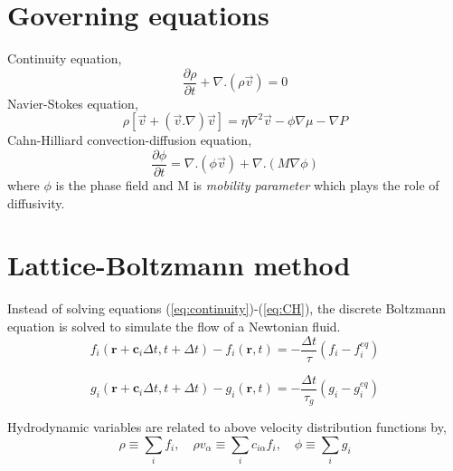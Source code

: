 \documentclass[a0,portrait]{a0poster}
\begin{document}
\begin{multicols}{3} %

\section{Governing equations}
Continuity equation,
\begin{equation}
\frac{\partial \rho}{\partial t} + \nabla.(\rho \vec{v}) = 0
\label{eq:continuity}
\end{equation}
Navier-Stokes equation,
\begin{equation}
\rho [\vec{v} + (\vec{v}.\nabla)\vec{v}] = \eta \nabla^2\vec{v}-\phi\nabla\mu - \nabla P
\label{eq:NS}
\end{equation}
Cahn-Hilliard convection-diffusion equation,
\begin{equation}
\frac{\partial \phi}{\partial t} = \nabla.(\phi \vec{v}) + \nabla.(M\nabla\phi)
\label{eq:CH}
\end{equation}
where $\phi$ is the phase field and M is \textit{mobility parameter} which plays the role of diffusivity.







\section{Lattice-Boltzmann method}
Instead of solving equations (\ref{eq:continuity})-(\ref{eq:CH}), the discrete Boltzmann equation is solved to simulate the flow of a Newtonian fluid.
\begin{equation}
f_{i}(\textbf{r}+\textbf{c}_{i}\Delta t, t+\Delta t) - f_{i}(\textbf{r},t) = -\frac{\Delta t}{\tau}(f_{i}-f_{i}^{eq})
\label{eq:f}
\end{equation}

\begin{equation}
g_{i}(\textbf{r}+\textbf{c}_{i}\Delta t, t+\Delta t) - g_{i}(\textbf{r},t) = -\frac{\Delta t}{\tau_{g}}(g_{i}-g_{i}^{eq})
\label{eq:g}
\end{equation}

Hydrodynamic variables are related to above velocity distribution functions by,
\begin{equation}
\rho \equiv \sum_{i} f_{i}, \quad \rho v_{\alpha} \equiv \sum_{i} c_{i\alpha} f_{i}, \quad \phi \equiv \sum_{i} g_{i}
\label{eq:fg}
\end{equation}


\end{multicols}
\end{document}
